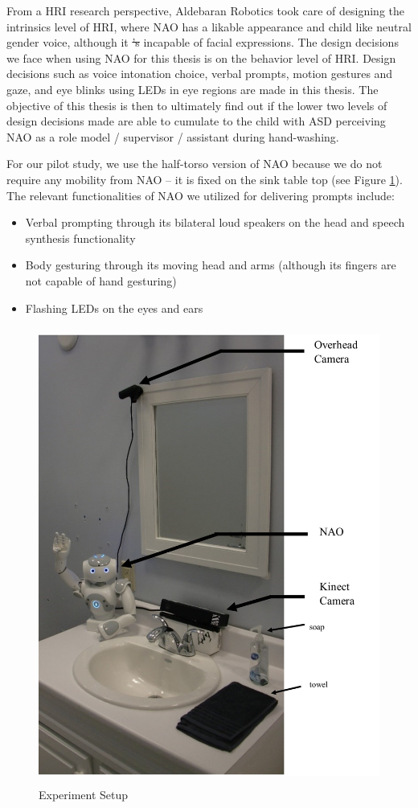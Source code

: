 \documentclass{ut-thesis}
\providecommand{\DIFaddtex}[1]{{\protect\color{blue}\uwave{#1}}} %
\providecommand{\DIFdeltex}[1]{{\protect\color{red}\sout{#1}}}                      %
\providecommand{\DIFaddbegin}{} %
\providecommand{\DIFaddend}{} %
\providecommand{\DIFdelbegin}{} %
\providecommand{\DIFdelend}{} %
\providecommand{\DIFaddbeginFL}{} %
\providecommand{\DIFaddendFL}{} %
\providecommand{\DIFdelbeginFL}{} %
\providecommand{\DIFdelendFL}{} %
\providecommand{\DIFadd}[1]{\texorpdfstring{\DIFaddtex{#1}}{#1}} %
\providecommand{\DIFdel}[1]{\texorpdfstring{\DIFdeltex{#1}}{}} %
\begin{document}
From a HRI research perspective, Aldebaran Robotics took care of designing the intrinsics level of HRI, where NAO has a likable appearance and child like neutral gender voice, although it \DIFdelbegin \DIFdel{'s }\DIFdelend \DIFaddbegin \DIFadd{is }\DIFaddend incapable of facial expressions.  The design decisions we face when using NAO for this thesis is on the behavior level of HRI.  Design decisions such as voice intonation choice, verbal prompts, motion gestures and gaze, and eye blinks using LEDs in eye regions are made in this thesis.  The objective of this thesis is then to ultimately find out if the lower two levels of design decisions made are able to cumulate to the child with ASD perceiving NAO as a role model / supervisor / assistant during hand-washing.

For our pilot study, we use the half-torso version of NAO because we do not require any mobility from NAO -- it is fixed on the sink table top (see Figure \ref{fig:ExpSetup}).  The relevant functionalities of NAO we utilized for delivering prompts include:
\begin{itemize}
	\item Verbal prompting through its bilateral loud speakers on the head and speech synthesis functionality
	\item Body gesturing through its moving head and arms (although its fingers are not capable of hand gesturing)
	\item Flashing LEDs on the eyes and ears
\end{itemize}
\begin{figure} [h]
	\centering
	\DIFdelbeginFL %
\DIFdelendFL \DIFaddbeginFL \includegraphics[height=15cm, keepaspectratio]{./img/exp_setup_labeled.jpg}
	\DIFaddendFL \caption{Experiment Setup}
	\label{fig:ExpSetup}
\end{figure}
\end{document}

